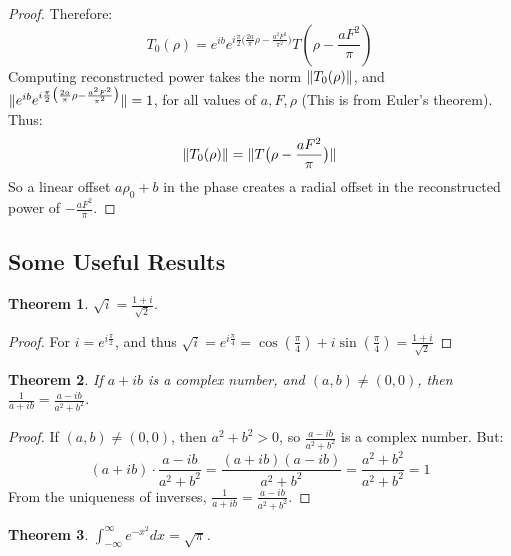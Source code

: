 \documentclass[oneside]{book}
\theoremstyle{mystyle}
\newtheorem{theorem}{Theorem}[section]
\DeclarePairedDelimiter\norm{\lVert}{\rVert}
\begin{document}
\begin{proof}
Therefore:
\begin{equation*}
T_0(\rho) = e^{ib}e^{i\frac{\pi}{2}\big(\frac{2a}{\pi}\rho - \frac{a^2F^2}{\pi^2}\big)}T(\rho - \frac{aF^2}{\pi})
\end{equation*}
Computing reconstructed power takes the norm $\norm{T_{0}(\rho)}$, and $\norm{e^{ib}e^{i\frac{\pi}{2}\big(\frac{2a}{\pi}\rho - \frac{a^2F^2}{\pi^2}\big)}} = 1$, for all values of $a,F, \rho$ (This is from Euler's theorem). Thus:
\begin{equation*}
    \norm{T_{0}(\rho)} = \norm{T\big(\rho - \frac{aF^2}{\pi}\big)}    
\end{equation*}
So a linear offset $a\rho_0+b$ in the phase creates a radial offset in the reconstructed power of $-\frac{aF^2}{\pi}$.
\end{proof}
\subsection{Some Useful Results}
\begin{theorem}
$\sqrt{i} = \frac{1+i}{\sqrt{2}}$.
\end{theorem}
\begin{proof}
For $i = e^{i\frac{\pi}{2}}$, and thus $\sqrt{i} = e^{i\frac{\pi}{4}} = \cos(\frac{\pi}{4})+i\sin(\frac{\pi}{4}) = \frac{1+i}{\sqrt{2}}$
\end{proof}
\begin{theorem}
If $a+ib$ is a complex number, and $(a,b) \ne (0,0)$, then $\frac{1}{a+ib} = \frac{a-ib}{a^2+b^2}$.
\end{theorem}
\begin{proof}
If $(a,b)\ne (0,0)$, then $a^2+b^2>0$, so $\frac{a-ib}{a^2+b^2}$ is a complex number. But:
\begin{equation*}
    (a+ib)\cdot \frac{a-ib}{a^2+b^2} = \frac{(a+ib)(a-ib)}{a^2+b^2} = \frac{a^2+b^2}{a^2+b^2} = 1
\end{equation*}
From the uniqueness of inverses, $\frac{1}{a+ib} = \frac{a-ib}{a^2+b^2}$.
\end{proof}
\begin{theorem}
$\int_{-\infty}^{\infty}e^{-x^2}dx = \sqrt{\pi}$.
\end{theorem}
\end{document}
